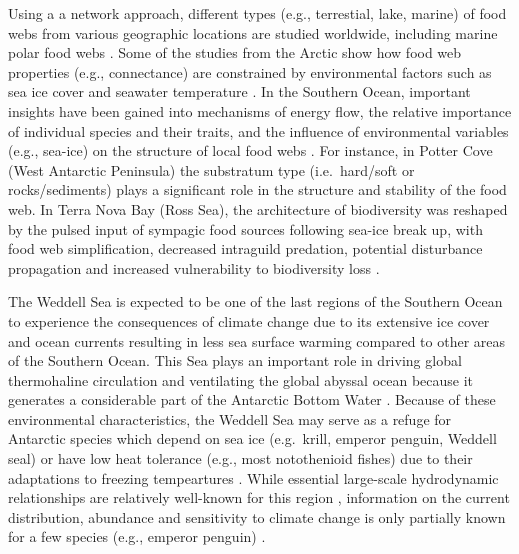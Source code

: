 \documentclass[gc, manuscript]{copernicus}
\begin{document}
Using a a network approach, different types (e.g., terrestial, lake,
marine) of food webs from various geographic locations are studied
worldwide, including marine polar food webs
\citep{Carscallen2012, Santana2013, Kortsch2019, Pecuchet2022}. Some of
the studies from the Arctic show how food web properties (e.g.,
connectance) are constrained by environmental factors such as sea ice
cover and seawater temperature \citep{Kortsch2019, Pecuchet2022}. In the
Southern Ocean, important insights have been gained into mechanisms of
energy flow, the relative importance of individual species and their
traits, and the influence of environmental variables (e.g., sea-ice) on
the structure of local food webs \citep{Cordone2020, Rossi2019}. For
instance, in Potter Cove (West Antarctic Peninsula) the substratum type
(i.e.~hard/soft or rocks/sediments) plays a significant role in the
structure and stability of the food web. In Terra Nova Bay (Ross Sea),
the architecture of biodiversity was reshaped by the pulsed input of
sympagic food sources following sea-ice break up, with food web
simplification, decreased intraguild predation, potential disturbance
propagation and increased vulnerability to biodiversity loss
\citep{Rossi2019}.

The Weddell Sea is expected to be one of the last regions of the
Southern Ocean to experience the consequences of climate change due to
its extensive ice cover and ocean currents \citep{Teschke2021} resulting
in less sea surface warming compared to other areas of the Southern
Ocean. This Sea plays an important role in driving global thermohaline
circulation and ventilating the global abyssal ocean because it
generates a considerable part of the Antarctic Bottom Water
\citep{Fahrbach2009}. Because of these environmental characteristics,
the Weddell Sea may serve as a refuge for Antarctic species which depend
on sea ice (e.g.~krill, emperor penguin, Weddell seal) or have low heat
tolerance (e.g., most notothenioid fishes) due to their adaptations to
freezing tempeartures \citep{Griffiths2017}. While essential large-scale
hydrodynamic relationships are relatively well-known for this region
\citep{deSteur2019}, information on the current distribution, abundance
and sensitivity to climate change is only partially known for a few
species (e.g., emperor penguin) \citep{Houstin2022}.
\end{document}
